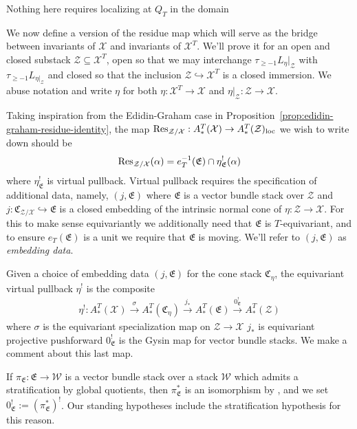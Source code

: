 \documentclass[12pt,dvipsnames]{amsart}
\newcommand{\red}[1]{\textcolor{Mahogany}{#1}}
\begin{document}
\red{Nothing here requires localizing at \(Q_T\) in the domain}

We now define a version of the residue map which will serve as the bridge between invariants of \(\mathcal X\) and invariants of \(\mathcal X^T\). We'll prove it for an open and closed substack \(\mathcal Z\subseteq \mathcal X^T\), open so that we may interchange \(\tau_{\geq -1}L_\eta|_{\mathcal Z}\) with \(\tau_{\geq -1}L_{\eta|_{\mathcal Z}}\) and closed so that the inclusion \(\mathcal Z\hookrightarrow \mathcal X^T\) is a closed immersion. We abuse notation and write \(\eta\) for both \(\eta:\mathcal X^T\to \mathcal X\) and \(\eta|_{\mathcal Z}:\mathcal Z\to \mathcal X\).

Taking inspiration from the Edidin-Graham case in Proposition~\ref{prop:edidin-graham-residue-identity}, the map \(\operatorname{Res}_{\mathcal Z/\mathcal X}:A_*^T(\mathcal X)\to A_*^T(\mathcal Z)_{\operatorname{loc}}\) we wish to write down should be
\begin{align}\label{eqn:preliminary-Res-defn}
  \operatorname{Res}_{\mathcal Z/\mathcal X}(\alpha) = e_T^{-1}(\mathfrak E)\cap \eta^!_{\mathfrak E}(\alpha)
\end{align}
where \(\eta^!_{\mathfrak E}\) is virtual pullback. Virtual pullback requires the specification of additional data, namely, \((j,\mathfrak E)\) where \(\mathfrak E\) is a vector bundle stack over \(\mathcal Z\) and \(j:\mathfrak C_{\mathcal Z/\mathcal X}\hookrightarrow \mathfrak E\) is a closed embedding of the intrinsic normal cone of \(\eta:\mathcal Z\to \mathcal X\). For this to make sense equivariantly we additionally need that \(\mathfrak E\) is \(T\)-equivariant, and to ensure \(e_T(\mathfrak E)\) is a unit we require that \(\mathfrak E\) is moving. We'll refer to $(j,\mathfrak E)$ as \emph{embedding data}.

Given a choice of embedding data \((j, \mathfrak E)\) for the cone stack \(\mathfrak C_\eta\), the equivariant virtual pullback \(\eta^!\) \cite{manolache_VirtualPullbacks2012} is the composite
\begin{align*}
  \eta^!:A^T_*(\mathcal X) \xrightarrow{\sigma} A^T_*(\mathfrak C_\eta) \xrightarrow{j_*} A^T_*(\mathfrak E) \xrightarrow{0^!_{\mathfrak E}} A^T_*(\mathcal Z)
\end{align*}
where \(\sigma\) is the equivariant specialization map on \(\mathcal Z \to \mathcal X\) \(j_*\) is equivariant projective pushforward \(0^!_{\mathfrak E}\) is the Gysin map for vector bundle stacks. We make a comment about this last map.

 If \(\pi_{\mathfrak E}:\mathfrak E\to \mathcal W\) is a vector bundle stack over a stack \(\mathcal W\) which admits a stratification by global quotients, then \(\pi^*_{\mathfrak E}\) is an isomorphism by \cite[Prop. 5.3.2]{kresch_CycleGroupsArtin1999}, and we set \(0^!_{\mathfrak E} := (\pi^*_{\mathfrak E})^!\). Our standing hypotheses include the stratification hypothesis for this reason.
\end{document}
